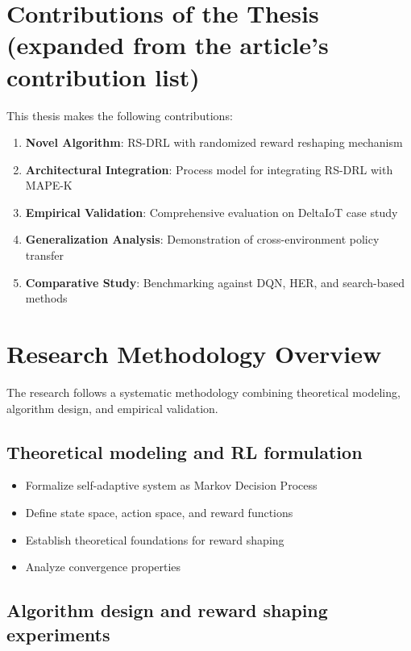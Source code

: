 \documentclass[11pt,a4paper]{article}
\begin{document}
\section{Contributions of the Thesis (expanded from the article's contribution list)}

This thesis makes the following contributions:

\begin{enumerate}
    \item \textbf{Novel Algorithm}: RS-DRL with randomized reward reshaping mechanism
    \item \textbf{Architectural Integration}: Process model for integrating RS-DRL with MAPE-K
    \item \textbf{Empirical Validation}: Comprehensive evaluation on DeltaIoT case study
    \item \textbf{Generalization Analysis}: Demonstration of cross-environment policy transfer
    \item \textbf{Comparative Study}: Benchmarking against DQN, HER, and search-based methods
\end{enumerate}

\section{Research Methodology Overview}

The research follows a systematic methodology combining theoretical modeling, algorithm design, and empirical validation.

\subsection{Theoretical modeling and RL formulation}

\begin{itemize}
    \item Formalize self-adaptive system as Markov Decision Process
    \item Define state space, action space, and reward functions
    \item Establish theoretical foundations for reward shaping
    \item Analyze convergence properties
\end{itemize}

\subsection{Algorithm design and reward shaping experiments}
\end{document}

